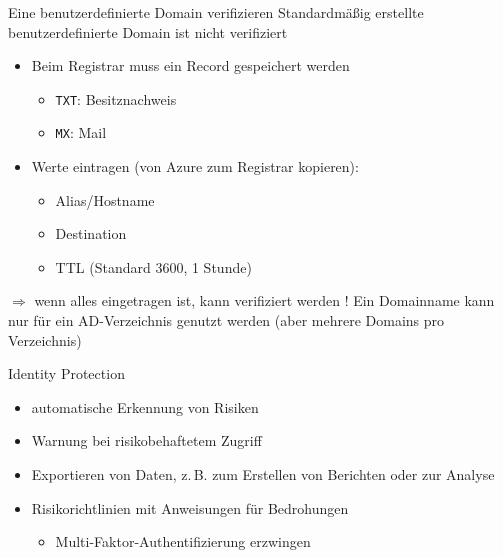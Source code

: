 \begin{flashcard}[Definition]{Eine benutzerdefinierte Domain verifizieren}
    Standardmäßig erstellte benutzerdefinierte Domain ist nicht verifiziert
    \begin{itemize}
        \item Beim Registrar muss ein Record gespeichert werden
            \begin{itemize}
                \item \texttt{TXT}: Besitznachweis
                \item \texttt{MX}: Mail
            \end{itemize}
        \item Werte eintragen (von Azure zum Registrar kopieren):
            \begin{itemize}
                \item Alias/Hostname
                \item Destination
                \item TTL (Standard 3600, 1 Stunde)
            \end{itemize}
    \end{itemize}
    $\Rightarrow$ wenn alles eingetragen ist, kann verifiziert werden
    \vspace{1cm}
    ! Ein Domainname kann nur für ein AD-Verzeichnis genutzt werden\newline
    (aber mehrere Domains pro Verzeichnis)
\end{flashcard}


\begin{flashcard}[Definition]{Identity Protection}
    \begin{itemize}
        \item automatische Erkennung von Risiken
        \item Warnung bei risikobehaftetem Zugriff
        \item Exportieren von Daten, z.\,B. zum Erstellen von Berichten oder zur Analyse
        \item Risikorichtlinien mit Anweisungen für Bedrohungen
            \begin{itemize}
                \item Multi-Faktor-Authentifizierung erzwingen
            \end{itemize}
    \end{itemize}
\end{flashcard}


